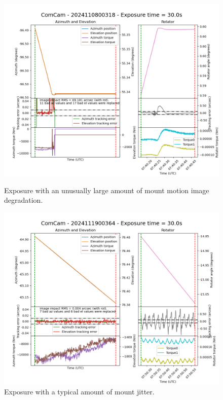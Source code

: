 \begin{figure}[ht]
    \centering
    \begin{minipage}{0.49\textwidth}
        \centering
        \includegraphics[width=\linewidth]{image_quality_figures/ComCam_Mount_Plot_2024110800318.png}
        \caption{Exposure with an unusually large amount of mount motion image degradation.}
        \label{fig:jitter_1}
    \end{minipage}\hfill
    \begin{minipage}{0.49\textwidth}
        \centering
        \includegraphics[width=\linewidth]{image_quality_figures/ComCam_Mount_Plot_2024111900364.png}
        \caption{Exposure with a typical amount of mount jitter.}
        \label{fig:jitter_2}
    \end{minipage}
\end{figure}